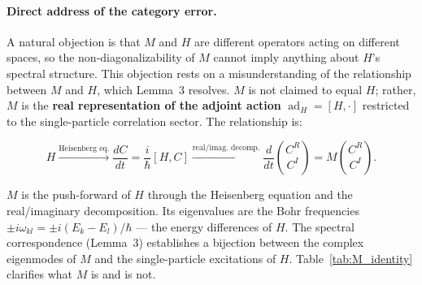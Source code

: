 \documentclass[aps,pra,preprint,groupedaddress,amsmath,amssymb,floatfix]{revtex4-2}
\begin{document}
\paragraph{Direct address of the category error.}
A natural objection is that $M$ and $H$ are different operators acting on different spaces, so the non-diagonalizability of $M$ cannot imply anything about $H$'s spectral structure. This objection rests on a misunderstanding of the relationship between $M$ and $H$, which Lemma~3 resolves. $M$ is not claimed to equal $H$; rather, $M$ is the \textbf{real representation of the adjoint action} $\operatorname{ad}_H = [H,\cdot]$ restricted to the single-particle correlation sector. The relationship is:

\begin{equation}
H \xrightarrow{\text{Heisenberg eq.}} \frac{dC}{dt} = \frac{i}{\hbar}[H,C] \xrightarrow{\text{real/imag. decomp.}} \frac{d}{dt}\binom{C^R}{C^I} = M\binom{C^R}{C^I}.
\label{eq:bridge_chain}
\end{equation}

$M$ is the push-forward of $H$ through the Heisenberg equation and the real/imaginary decomposition. Its eigenvalues are the Bohr frequencies $\pm i\omega_{kl} = \pm i(E_k - E_l)/\hbar$ --- the energy differences of $H$. The spectral correspondence (Lemma~3) establishes a bijection between the complex eigenmodes of $M$ and the single-particle excitations of $H$. Table~\ref{tab:M_identity} clarifies what $M$ is and is not.
\end{document}
